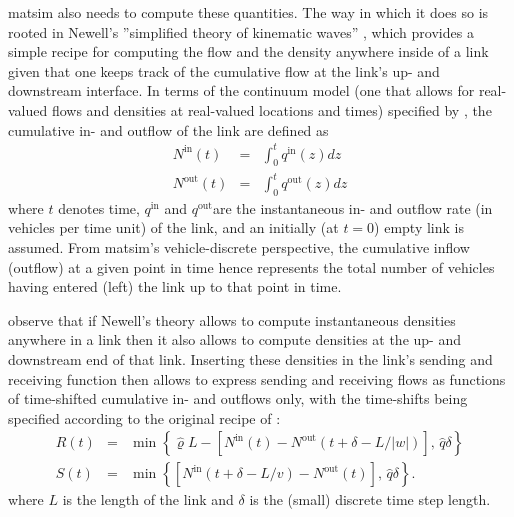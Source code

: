 \gls{matsim} also needs to compute these quantities. The way in which it
does so is rooted in Newell's {}''simplified theory of kinematic
waves'' \citep{newell-1993}, which provides a simple recipe for
computing the flow and the density anywhere inside of a link given
that one keeps track of the cumulative flow at the link's up- and
downstream interface. In terms of the continuum model (\ie one that
allows for real-valued flows and densities at real-valued locations
and times) specified by \citet{newell-1993}, the cumulative in- and
outflow of the link are defined as
\begin{eqnarray}
N^{\text{in}}(t) & = & \int_{0}^{t}q^{\text{in}}(z)dz\label{eq:cum-in}\\
N^{\text{out}}(t) & = & \int_{0}^{t}q^{\text{out}}(z)dz\label{eq:cum-out}
\end{eqnarray}
where $t$ denotes time, $q^{\text{in}}$ and $q^{\text{out}}$are
the instantaneous in- and outflow rate (in vehicles per time unit)
of the link, and an initially (at $t=0$) empty link is assumed. From
\gls{matsim}'s vehicle-discrete perspective, the cumulative inflow (outflow)
at a given point in time hence represents the total number of vehicles
having entered (left) the link up to that point in time.

\citet{yperman-2006,yperman-phd} observe that if Newell's theory
allows to compute instantaneous densities anywhere in a link then
it also allows to compute densities at the up- and downstream end
of that link. Inserting these densities in the link's sending and
receiving function then allows to express sending and receiving flows
as functions of time-shifted cumulative in- and outflows only, with
the time-shifts being specified according to the original recipe of
\citet{newell-1993}:
\begin{eqnarray}
R(t) & = & \min\left\{ \hat{\varrho}L-\left[N^{\text{in}}(t)-N^{\text{out}}(t+\delta-L/|w|)\right],\,\hat{q}\delta\right\} \label{eq:R-yperman}\\
S(t) & = & \min\left\{ \left[N^{\text{in}}(t+\delta-L/v)-N^{\text{out}}(t)\right],\,\hat{q}\delta\right\} .\label{eq:S-yperman}
\end{eqnarray}
where $L$ is the length of the link and $\delta$ is the (small)
discrete time step length.

